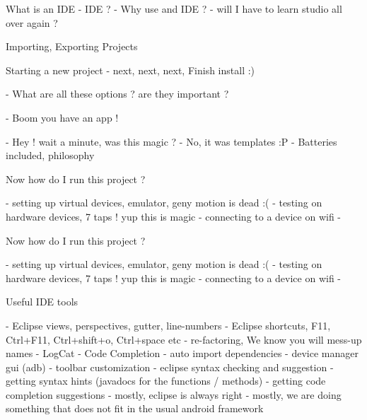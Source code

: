 \documentclass[11pt]{beamer}
\begin{document}
\begin{frame}[containsverbatim]{What is an IDE}
- IDE ? 
- Why use and IDE ?
- will I have to learn studio all over again ?

\end{frame}

\begin{frame}[containsverbatim]{Importing, Exporting Projects}

\end{frame}

\begin{frame}[containsverbatim]{Starting a new project}
- next, next, next, Finish install :)

- What are all these options ? are they important ?

- Boom you have an app !

- Hey ! wait a minute, was this magic ? 
- No, it was templates :P
- Batteries included, philosophy 
\end{frame}

\begin{frame}[containsverbatim]{Now how do I run this project ?}

- setting up virtual devices, emulator, geny motion is dead :(
- testing on hardware devices, 7 taps ! yup this is magic
- connecting to a device on wifi 
- 
\end{frame}

\begin{frame}[containsverbatim]{Now how do I run this project ?}

- setting up virtual devices, emulator, geny motion is dead :(
- testing on hardware devices, 7 taps ! yup this is magic
- connecting to a device on wifi 
- 
\end{frame}


\begin{frame}[containsverbatim]{Useful IDE tools}

- Eclipse views, perspectives, gutter, line-numbers
- Eclipse shortcuts, F11, Ctrl+F11, Ctrl+shift+o, Ctrl+space etc
- re-factoring, We know you will mess-up names
- LogCat
- Code Completion
- auto import dependencies
- device manager gui (adb)
- toolbar customization
- eclipse syntax checking and suggestion
- getting syntax hints (javadocs for the functions / methods)
- getting code completion suggestions
- mostly, eclipse is always right
- mostly, we are doing something that does not fit in the usual android framework

\end{frame}
\end{document}
